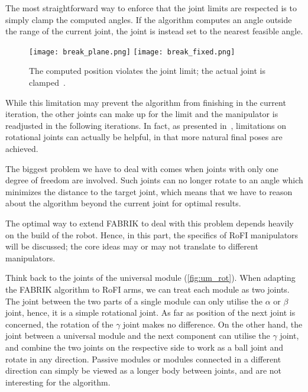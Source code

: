 The most straightforward way to enforce that the joint limits are respected is to simply clamp the computed angles. If the algorithm computes an angle outside the range of the current joint,
the joint is instead set to the nearest feasible angle.

\begin{figure}[h]
    \centering
    \begin{minipage}{\textwidth}
        \texttt{[image: break\_plane.png]}
        \texttt{[image: break\_fixed.png]}
    \end{minipage}
    \caption{The computed position violates the joint limit; the actual joint is clamped~\cite{Ondika2021thesis}.}\label{fig:break}
\end{figure}

While this limitation may prevent the algorithm from finishing in the current iteration, the other joints can make up for the limit and the manipulator is readjusted in the following iterations. In fact, as presented in~\cite{fabrik}, limitations on rotational joints can actually be helpful, in that more natural final poses are achieved.

The biggest problem we have to deal with comes when joints with only one degree of freedom are involved. Such joints can no longer rotate to an angle which minimizes the distance to the target joint, which means that we have to reason about the algorithm beyond the current joint for optimal results.

The optimal way to extend FABRIK to deal with this problem depends heavily on the build of the robot. Hence, in this part, the specifics of RoFI manipulators will be discussed; the core ideas may or may not translate to different manipulators.

Think back to the joints of the universal module (\ref{fig:um_rot}). When adapting the FABRIK algorithm to RoFI arms, we can treat each module as two joints. The joint between the two parts of a single module can only utilise the $\alpha$ or $\beta$ joint, hence, it is a simple rotational joint. As far as position of the next joint is concerned, the rotation of the $\gamma$ joint makes no difference. On the other hand, the joint between a universal module and the next component can utilise the $\gamma$ joint, and combine the two joints on the respective side to work as a ball joint and rotate in any direction. Passive modules or modules connected in a different direction can simply be viewed as a longer body between joints, and are not interesting for the algorithm.

